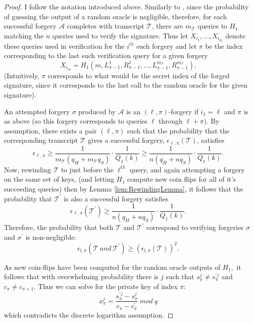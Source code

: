 \documentclass[12pt,oneside,english]{amsart}
\numberwithin{equation}{section}
\numberwithin{figure}{section}
\theoremstyle{plain}
\theoremstyle{plain}
\theoremstyle{remark}
\theoremstyle{plain}
\theoremstyle{remark}
\theoremstyle{remark}
\theoremstyle{plain}
\theoremstyle{definition}
\begin{document}
\begin{proof}
I follow the notation introduced above. Similarly to \cite[Theorem 1]{LWW},
since the probability of guessing the output of a random oracle is
negligible, therefore, for each successful forgery $\mathcal{A}$ completes
with transcript $\mathcal{T}$, there are $m_{\mathcal{T}}$ queries
to $H_{1}$ matching the $n$ queries used to verify the signature.
Thus let $X_{i_{1}},...,X_{i_{m}}$ denote these queries used
in verification for the $i^{th}$ such forgery and let $\pi$ be the
index corresponding to the last such verification query for a given
forgery 
\[
X_{i_{m}}=H_{1}\left(m,L_{\pi-1}^{1},R_{\pi-1}^{1},...,L_{\pi-1}^{m_{\mathcal{T}}},R_{\pi-1}^{m_{\mathcal{T}}}\right).
\]
(Intuitively, $\pi$ corresponds to what would be the secret index
of the forged signature, since it corresponds to the last call to
the random oracle for the given signature).

An attempted forgery $\sigma$ produced by $\mathcal{A}$ is an $\left(\ell,\pi\right)$-forgery
if $i_{1}=\ell$ and $\pi$ is as above (so this forgery corresponds
to queries $\ell$ through $\ell+\pi$). By assumption, there exists
a pair $\left(\ell,\pi\right)$ such that the probability that the
corresponding transcript $\mathcal{T}$ gives a successful forgery, 
$\epsilon_{\ell,\pi}\left(\mathcal{T}\right)$, satisfies 
\[
\epsilon_{\ell,\pi}\ge\frac{1}{m_{\mathcal{T}}\left(q_{H}+m_{\mathcal{T}}q_{S}\right)}\cdot\frac{1}{Q_{1}\left(k\right)}\ge\frac{1}{n\left(q_{H}+nq_{S}\right)}\cdot\frac{1}{Q_{1}\left(k\right)}.
\]
 Now, rewinding $\mathcal{T}$ to just before the $\ell^{th}$ query,
and again attempting a forgery on the same set of keys, (and letting
$H_{1}$ compute new coin flips for all of it's succeeding queries)
then by Lemma \ref{lem:RewindingLemma}, it follows that the probability
that $\mathcal{\mathcal{T}^{\prime}}$ is also a successful forgery
satisfies 
\[
\epsilon_{\ell,\pi}\left(\mathcal{T}^{\prime}\right)\ge\frac{1}{n\left(q_{H}+nq_{S}\right)}\cdot\frac{1}{Q_{1}\left(k\right)}.
\]
 Therefore, the probability that both $\mathcal{T}$ and $\mathcal{T}^{\prime}$
correspond to verifying forgeries $\sigma$ and $\sigma^{\prime}$
is non-negligible: 
\[
\epsilon_{l,\pi}\left(\mathcal{T\ }and\ \mathcal{T}^{\prime}\right)\ge\left(\epsilon_{l,\pi}\left(\mathcal{T}\right)\right)^{2}.
\]


As new coin-flips have been computed for the random oracle outputs
of $H_{1},$ it follows that with overwhelming probability there is
$j$ such that $s_{\pi}^{j}\neq s_{\pi}^{\prime j}$ and $c_{\pi}\neq c_{\pi+1}$.
Thus we can solve for the private key of index $\pi$: 
\[
x_{\pi}^{j}=\frac{s_{\pi}^{\prime j}-s_{\pi}^{j}}{c_{\pi}-c_{\pi}^{\prime}}\ mod\ q
\]
 which contradicts the discrete logarithm assumption. 
\end{proof}
\end{document}
